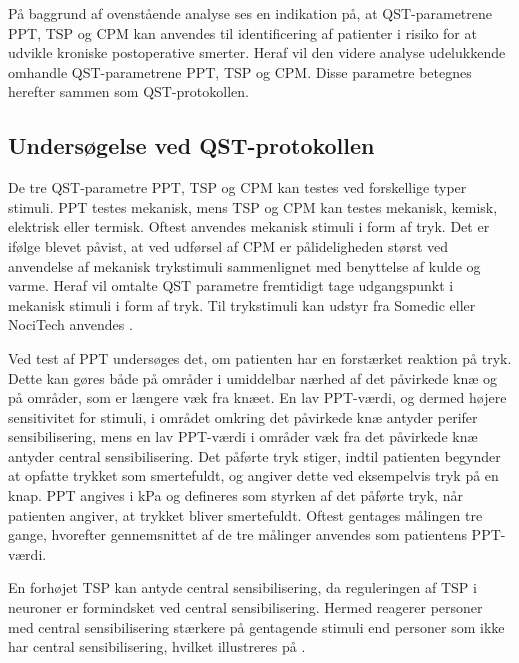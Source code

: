 På baggrund af ovenstående analyse ses en indikation på, at QST-parametrene PPT, TSP og CPM kan anvendes til identificering af patienter i risiko for at udvikle kroniske postoperative smerter. Heraf vil den videre analyse udelukkende omhandle QST-parametrene PPT, TSP og CPM. Disse parametre betegnes herefter sammen som QST-protokollen. 

\subsection{Undersøgelse ved QST-protokollen}
De tre QST-parametre PPT, TSP og CPM kan testes ved forskellige typer stimuli. PPT testes mekanisk, mens TSP og CPM kan testes mekanisk, kemisk, elektrisk eller termisk. Oftest anvendes mekanisk stimuli i form af tryk. \citep{Yarnitsky2006} \citep{Suokas2012} Det er ifølge  blevet påvist, at ved udførsel af CPM er pålideligheden størst ved anvendelse af mekanisk trykstimuli sammenlignet med benyttelse af kulde og varme. Heraf vil omtalte QST parametre fremtidigt tage udgangspunkt i mekanisk stimuli i form af tryk. Til trykstimuli kan udstyr fra Somedic eller NociTech anvendes \citep{Petersen2016} \citep{Wylde2015b}. 

Ved test af PPT undersøges det, om patienten har en forstærket reaktion på tryk. Dette kan gøres både på områder i umiddelbar nærhed af det påvirkede knæ og på områder, som er længere væk fra knæet. En lav PPT-værdi, og dermed højere sensitivitet for stimuli, i området omkring det påvirkede knæ antyder perifer sensibilisering, mens en lav PPT-værdi i områder væk fra det påvirkede knæ antyder central sensibilisering. \citep{Suokas2012} Det påførte tryk stiger, indtil patienten begynder at opfatte trykket som smertefuldt, og angiver dette ved eksempelvis tryk på en knap. PPT angives i kPa og defineres som styrken af det påførte tryk, når patienten angiver, at trykket bliver smertefuldt. Oftest gentages målingen tre gange, hvorefter gennemsnittet af de tre målinger anvendes som patientens PPT-værdi. \citep{Petersen2015} \citep{Wylde2015b} 

En forhøjet TSP kan antyde central sensibilisering, da reguleringen af TSP i neuroner er formindsket ved central sensibilisering. \citep{Arendt-Nielsen2015b} Hermed reagerer personer med central sensibilisering stærkere på gentagende stimuli end personer som ikke har central sensibilisering, hvilket illustreres på . \citep{Arendt-Nielsen2015b} 

